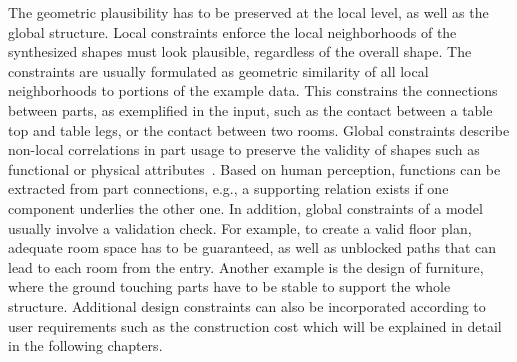 %
The geometric plausibility has to be preserved at the local level, as well as the global structure. Local constraints enforce the local neighborhoods of the synthesized shapes must look plausible, regardless of the overall shape. The constraints are usually formulated as geometric similarity of all local neighborhoods to portions of the example data. This constrains the connections between parts, as exemplified in the input, such as the contact between a table top and table legs, or the contact between two rooms. Global constraints describe non-local correlations in part usage to preserve the validity of shapes such as functional or physical attributes~\cite{mitra_howThingsWork_sig_10,Zheng:2013}. Based on human perception, functions can be extracted from part connections, e.g., a supporting relation exists if one component underlies the other one. In addition, global constraints of a model usually involve a validation check. For example, to create a valid floor plan, adequate room space has to be guaranteed, as well as unblocked paths that can lead to each room from the entry. Another example is the design of furniture, where the ground touching parts have to be stable to support the whole structure. Additional design constraints can also be incorporated according to user requirements such as the construction cost which will be explained in detail in the following chapters.


